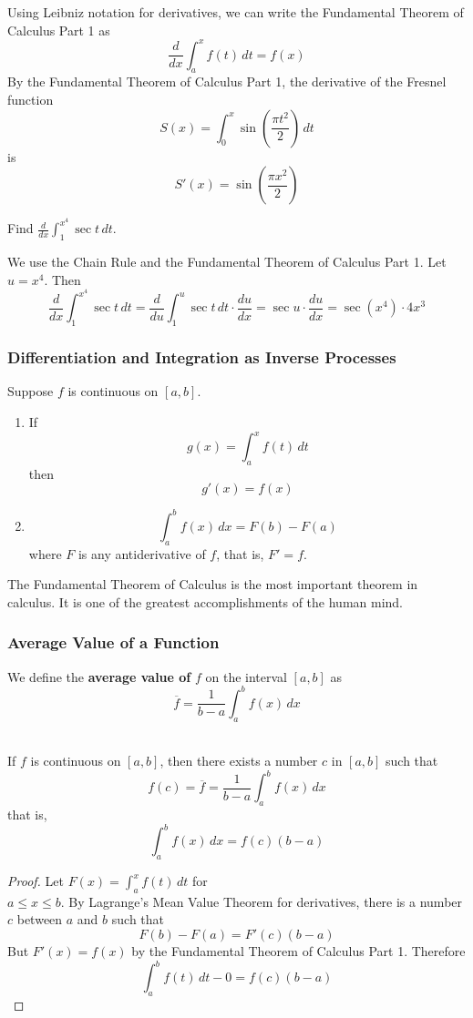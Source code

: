 Using Leibniz notation for derivatives, we can write the Fundamental Theorem
of Calculus Part 1 as
\[\frac{d}{dx}\int_a^x f(t)\,dt=f(x)\]
By the Fundamental Theorem of Calculus Part 1, the derivative of the Fresnel
function
\[S(x)=\int_0^x \sin\left(\frac{\pi t^2}{2}\right)\,dt\]
is
\[S'(x)=\sin\left(\frac{\pi x^2}{2}\right)\]
\begin{problem}
    Find \(\displaystyle{\frac{d}{dx}\int_1^{x^4}\sec t\,dt}\).
\end{problem}
\begin{solution}
    We use the Chain Rule and the Fundamental Theorem of Calculus Part 1.
    Let \(u=x^4\).
    Then
    \[\frac{d}{dx}\int_1^{x^4}\sec t\,dt
    =\frac{d}{du}\int_1^u\sec t\,dt\cdot\frac{du}{dx}
    =\sec u\cdot\frac{du}{dx}=\sec (x^4)\cdot 4x^3\]
\end{solution}

\subsubsection*{Differentiation and Integration as Inverse Processes}
\begin{theorem}
    Suppose \(f\) is continuous on \([a,b]\).
    \begin{enumerate}
        \item If
        \[g(x)=\int_a^x f(t)\,dt\]
        then
        \[g'(x)=f(x)\]
        \item
        \[\int_a^b f(x)\,dx=F(b)-F(a)\]
        where \(F\) is any antiderivative of \(f\), that is, \(F'=f\).
    \end{enumerate}
\end{theorem}
The Fundamental Theorem of Calculus is the most important theorem in calculus.
It is one of the greatest accomplishments of the human mind.

\subsubsection*{Average Value of a Function}
We define the \textbf{average value of} \(f\) on the interval \([a,b]\) as
\[\overline{f}=\frac{1}{b-a}\int_a^b f(x)\,dx\]\
\begin{theorem}
    If \(f\) is continuous on \([a,b]\), then there exists a number \(c\) in
    \([a,b]\) such that
    \[f(c)=\overline{f}=\frac{1}{b-a}\int_a^b f(x)\,dx\]
    that is,
    \[\int_a^b f(x)\,dx=f(c)(b-a)\]
\end{theorem}
\begin{proof}
    Let \(\displaystyle{F(x)=\int_a^x f(t)\,dt}\) for \\
    \(a\leq x\leq b\).
    By Lagrange's Mean Value Theorem for derivatives, there is a number \(c\)
    between \(a\) and \(b\) such that
    \[F(b)-F(a)=F'(c)(b-a)\]
    But \(F'(x)=f(x)\) by the Fundamental Theorem of Calculus Part 1.
    Therefore
    \[\int_a^b f(t)\,dt-0=f(c)(b-a)\]
\end{proof}